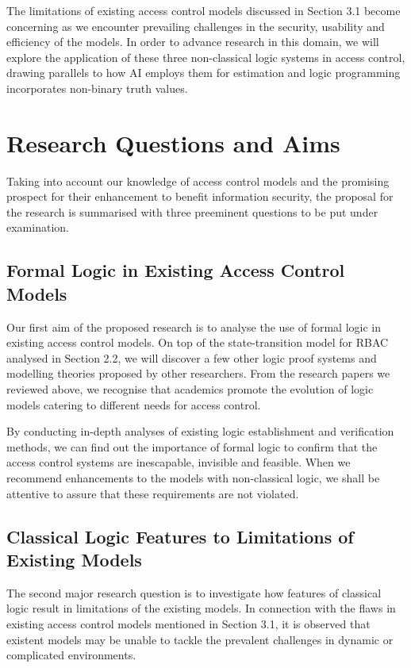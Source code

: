 \documentclass{article}
\begin{document}
The limitations of existing access control models discussed in Section 3.1 become concerning as we encounter prevailing challenges in the security, usability and efficiency of the models. In order to advance research in this domain, we will explore the application of these three non-classical logic systems in access control, drawing parallels to how AI employs them for estimation and logic programming incorporates non-binary truth values.

\section{Research Questions and Aims}

Taking into account our knowledge of access control models and the promising prospect for their enhancement to benefit information security, the proposal for the research is summarised with three preeminent questions to be put under examination.

\subsection{Formal Logic in Existing Access Control Models}

Our first aim of the proposed research is to analyse the use of formal logic in existing access control models. On top of the state-transition model for RBAC analysed in Section 2.2, we will discover a few other logic proof systems and modelling theories proposed by other researchers. From the research papers we reviewed above, we recognise that academics promote the evolution of logic models catering to different needs for access control.

By conducting in-depth analyses of existing logic establishment and verification methods, we can find out the importance of formal logic to confirm that the access control systems are inescapable, invisible and feasible. When we recommend enhancements to the models with non-classical logic, we shall be attentive to assure that these requirements are not violated.

\subsection{Classical Logic Features to Limitations of Existing Models}

The second major research question is to investigate how features of classical logic result in limitations of the existing models. In connection with the flaws in existing access control models mentioned in Section 3.1, it is observed that existent models may be unable to tackle the prevalent challenges in dynamic or complicated environments.
\end{document}
